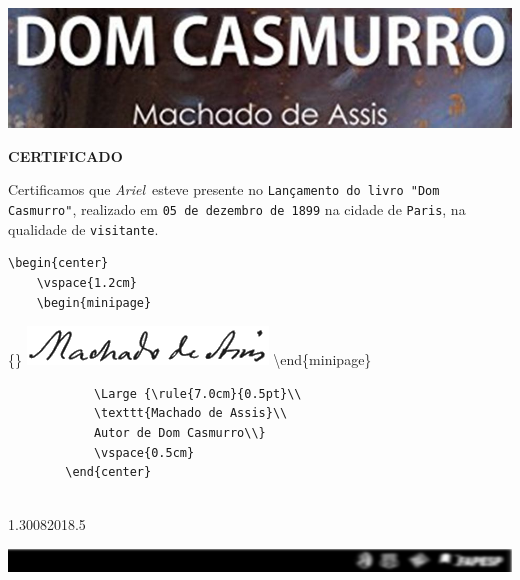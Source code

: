 \documentclass[]{article}
\title{}
\author{}
\date{}
\begin{document}
\thispagestyle{empty} 
\begin{minipage}{\textwidth}
            \includegraphics[width=\textwidth]{imagens/header.jpg}

            \sffamily
            \bigskip
            \bigskip
\end{minipage}

\begin{center}
                {\Huge \textbf{CERTIFICADO}}\\
                \bigskip
                \bigskip
            \end{center}

\begin{center}
                \begin{minipage}{0.8\textwidth}
                    {\Large Certificamos que \emph{Ariel}\ esteve presente no 
                    \texttt{Lançamento do livro "Dom Casmurro"},  realizado em \texttt{05 de dezembro de 1899} na cidade de 
                    \texttt{Paris}, na qualidade de \texttt{visitante}.}
                \end{minipage}
            \end{center}

\begin{verbatim}
\begin{center}
    \vspace{1.2cm}
    \begin{minipage}
\end{verbatim}

\{\textwidth\} \center
\includegraphics[width=\textwidth]{imagens/assinatura.png}
\textbackslash end\{minipage\}

\begin{verbatim}
            \Large {\rule{7.0cm}{0.5pt}\\
            \texttt{Machado de Assis}\\
            Autor de Dom Casmurro\\}
            \vspace{0.5cm}
        \end{center}    
        
\end{verbatim}

1.30082018.5

\begin{minipage}
{\textwidth}
            \includegraphics[width=\textwidth]{imagens/footer.jpg}

\end{minipage}
\end{document}
